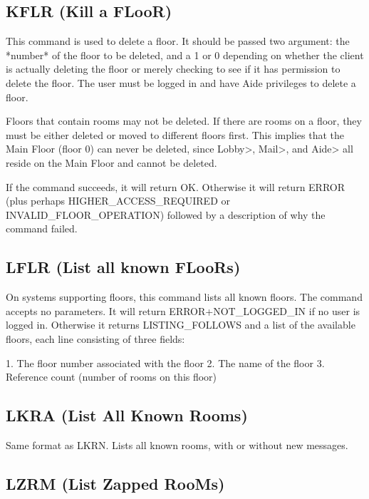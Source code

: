 \subsection{KFLR (Kill a FLooR)}

 This command is used to delete a floor.  It should be passed two
argument: the *number* of the floor to be deleted, and a 1 or 0 depending
on whether the client is actually deleting the floor or merely checking to
see if it has permission to delete the floor.  The user must be logged in
and have Aide privileges to delete a floor.

 Floors that contain rooms may not be deleted.  If there are rooms on a floor,
they must be either deleted or moved to different floors first.  This implies
that the Main Floor (floor 0) can never be deleted, since Lobby>, Mail>, and
Aide> all reside on the Main Floor and cannot be deleted.

 If the command succeeds, it will return OK.  Otherwise it will return
ERROR (plus perhaps HIGHER_ACCESS_REQUIRED or INVALID_FLOOR_OPERATION)
followed by a description of why the command failed.



\subsection{LFLR (List all known FLooRs)}

 On systems supporting floors, this command lists all known floors.  The
command accepts no parameters.  It will return ERROR+NOT_LOGGED_IN if no
user is logged in.  Otherwise it returns LISTING_FOLLOWS and a list of
the available floors, each line consisting of three fields:

 1. The floor number associated with the floor
 2. The name of the floor
 3. Reference count (number of rooms on this floor)



\subsection{LKRA (List All Known Rooms)}

 Same format as LKRN.  Lists all known rooms, with or without new messages.



\subsection{LZRM (List Zapped RooMs)}

